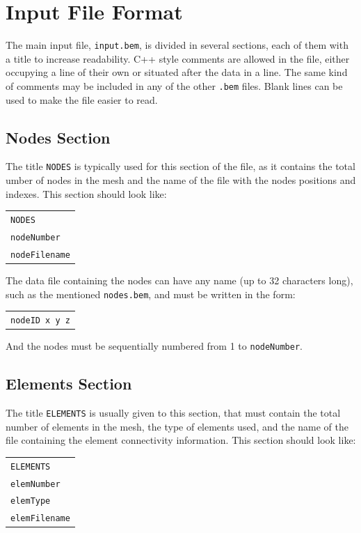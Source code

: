 \documentclass[12pt]{article}
\begin{document}
\section{Input File Format}
The main input file, \verb+input.bem+, is divided in several sections, each of them with a title to increase readability. C++ style comments are allowed in the file, either occupying a line of their own or situated after the data in a line. The same kind of comments may be included in any of the other \verb+.bem+ files. Blank lines can be used to make the file easier to read.

\subsection{Nodes Section}
The title \verb+NODES+ is typically used for this section of the file, as it contains the total umber of nodes in the mesh and the name of the file with the nodes positions and indexes. This section should look like:

\begin{tabular}{l}
\texttt{NODES}\\
\texttt{nodeNumber}\\
\texttt{nodeFilename}
\end{tabular}

The data file containing the nodes can have any name (up to 32 characters long), such as the mentioned \verb+nodes.bem+, and must be written in the form:

\begin{tabular}{l}
\texttt{nodeID x y z}
\end{tabular}

And the nodes must be sequentially numbered from 1 to \verb+nodeNumber+.

\subsection{Elements Section}
The title \verb+ELEMENTS+ is usually given to this section, that must contain the total number of elements in the mesh, the type of elements used, and the name of the file containing the element connectivity information. This section should look like:

\begin{tabular}{l}
\texttt{ELEMENTS}\\
\texttt{elemNumber}\\
\texttt{elemType}\\
\texttt{elemFilename}
\end{tabular}
\end{document}
